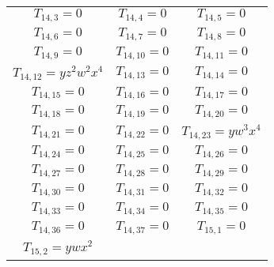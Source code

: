 \documentclass[12pt]{memoireuqam1.3}
\begin{document}
\begin{longtable}{|c|c|c|}
$T_{14,3}= 0$&

$T_{14,4}= 0$&

$T_{14,5}= 0$\\

$T_{14,6}= 0$&

$T_{14,7}= 0$&

$T_{14,8}= 0$\\

$T_{14,9}= 0$&

$T_{14,10}= 0$&

$T_{14,11}= 0$\\

$T_{14,12}= yz^2w^2x^4$&

$T_{14,13}= 0$&

$T_{14,14}= 0$\\

$T_{14,15}= 0$&

$T_{14,16}= 0$&

$T_{14,17}= 0$\\

$T_{14,18}= 0$&

$T_{14,19}= 0$&

$T_{14,20}= 0$\\

$T_{14,21}= 0$&

$T_{14,22}= 0$&

$T_{14,23}= yw^3x^4$\\

$T_{14,24}= 0$&

$T_{14,25}= 0$&

$T_{14,26}= 0$\\

$T_{14,27}= 0$&

$T_{14,28}= 0$&

$T_{14,29}= 0$\\

$T_{14,30}= 0$&

$T_{14,31}= 0$&

$T_{14,32}= 0$\\

$T_{14,33}= 0$&

$T_{14,34}= 0$&

$T_{14,35}= 0$\\

$T_{14,36}= 0$&

$T_{14,37}= 0$&

$T_{15,1}= 0$\\

$T_{15,2}= ywx^2$&


\end{longtable}
\end{document}
